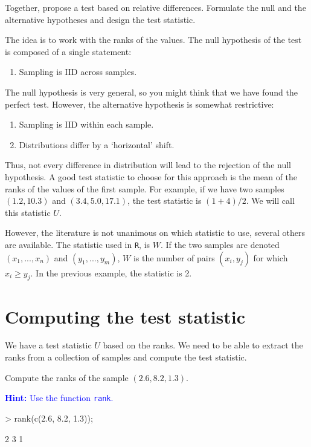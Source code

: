 \documentclass[a4paper]{article}
\theoremstyle{definition}
\begin{document}
\begin{Exercise}
Together, propose a test based on relative differences. Formulate the
null and the alternative hypotheses and design the test statistic.
\end{Exercise}
\begin{Answer}
The idea is to work with the ranks of the values. The null hypothesis
of the test is composed of a single statement:
\begin{enumerate}
\item
Sampling is IID across samples.
\end{enumerate}
The null hypothesis is very general, so you might think that we have
found the perfect test. However, the alternative hypothesis is somewhat
restrictive:
\begin{enumerate}
\item
Sampling is IID within each sample.
\item
Distributions differ by a `horizontal' shift.
\end{enumerate}
Thus, not every difference in distribution will lead to the rejection
of the null hypothesis.
A good test statistic to choose for this approach is the mean of the
ranks of the values of the first sample. For example, if we have two
samples $(1.2, 10.3)$ and $(3.4, 5.0, 17.1)$, the test statistic is
$(1+4)/2$. We will call this statistic $U$.

However, the literature is not unanimous on which statistic to
use, several others are available. The statistic used in \texttt{R},
is $W$. If the two samples are denoted $(x_1, ..., x_n)$ and
$(y_1, ..., y_m)$, $W$ is the number of pairs $(x_i, y_j)$
for which $x_i \geq y_j$. In the previous example, the statistic is 2.
\end{Answer}


\section{Computing the test statistic}

We have a test statistic $U$ based on the ranks. We need to
be able to extract the ranks from a collection of samples and
compute the test statistic.

\begin{Exercise}
Compute the ranks of the sample $(2.6, 8.2, 1.3)$.
\par\noindent\textcolor{Blue}{\textbf{Hint:} Use the function
\texttt{rank}.}
\end{Exercise}
\begin{Answer}
\begin{Schunk}
\begin{Sinput}
> rank(c(2.6, 8.2, 1.3));
\end{Sinput}
\begin{Soutput}
[1] 2 3 1
\end{Soutput}
\end{Schunk}
\end{Answer}
\end{document}
